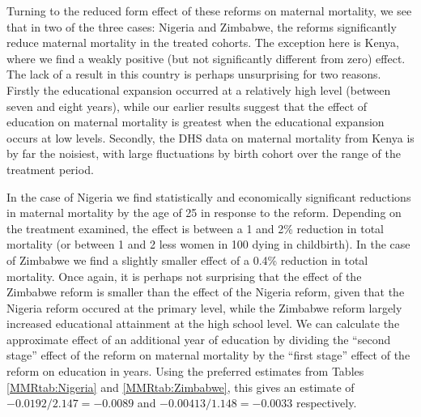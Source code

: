 \documentclass{article}[12pt,subeqn]
\begin{document}
\begin{spacing}{1.4}
Turning to the reduced form effect of these reforms on maternal mortality, we see 
that in two of the three cases: Nigeria and Zimbabwe, the reforms significantly 
reduce maternal mortality in the treated cohorts. The exception here is Kenya,
where we find a weakly positive (but not significantly different from zero) effect.  
The lack of a result in this country is perhaps unsurprising for two reasons.  
Firstly the educational expansion occurred at a relatively high level (between 
seven and eight years), while our earlier results suggest that the effect of 
education on maternal mortality is greatest when the educational expansion occurs 
at low levels.  Secondly, the DHS data on maternal mortality from Kenya is by far 
the noisiest, with large fluctuations by birth cohort over the range of the 
treatment period.

In the case of Nigeria we find statistically and economically significant 
reductions in maternal mortality by the age of 25 in response to the reform.  
Depending on the treatment examined, the effect is between a 1 and 2\% reduction 
in total mortality (or between 1 and 2 less women in 100 dying in childbirth).  
In the case of Zimbabwe we find a slightly smaller effect of a 0.4\% reduction in 
total mortality.  Once again, it is perhaps not surprising that the effect of the 
Zimbabwe reform is smaller than the effect of the Nigeria reform, given that the 
Nigeria reform occured at the primary level, while the Zimbabwe reform largely 
increased educational attainment at the high school level.  We can calculate the 
approximate effect of an additional year of education by dividing the 
``second stage'' effect of the reform on maternal mortality by the ``first stage'' 
effect of the reform on education in years.  Using the preferred estimates from 
Tables \ref{MMRtab:Nigeria} and \ref{MMRtab:Zimbabwe}, this gives an estimate of 
$-0.0192/2.147=-0.0089$ and $-0.00413/1.148=-0.0033$ respectively.


\end{spacing}
\end{document}
